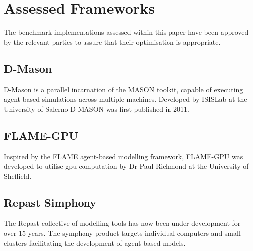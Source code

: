 \section{Assessed Frameworks\label{sec:assessed-frameworks}}
  The benchmark implementations assessed within this paper have been approved by the relevant parties to assure that their optimisation is appropriate.
  \subsection{D-Mason}
    D-Mason is a parallel incarnation of the MASON toolkit, capable of executing agent-based simulations across multiple machines. Developed by ISISLab at the University of Salerno D-MASON was first published in 2011\cite{CD*11}.
  \subsection{FLAME-GPU}
    Inspired by the FLAME agent-based modelling framework, FLAME-GPU was developed to utilise \gls{gpu} computation by Dr Paul Richmond at the University of Sheffield\cite{RR08}.
  \subsection{Repast Simphony}
    The Repast collective of modelling tools has now been under development for over 15 years. The symphony product targets individual computers and small clusters facilitating the development of agent-based models\cite{repast2013}.